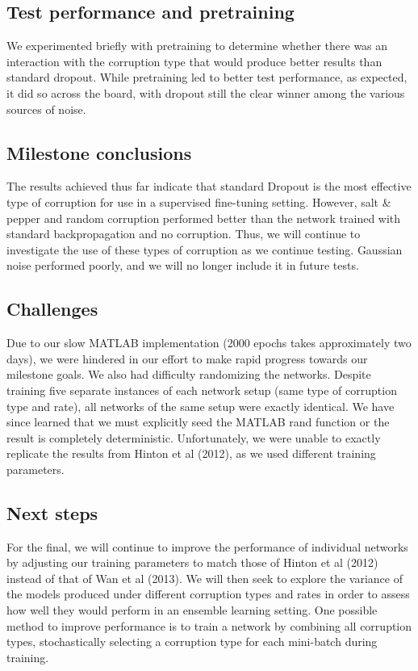 \documentclass{article} %
\begin{document}
\subsection{Test performance and pretraining}
We experimented briefly with pretraining to determine whether there was an interaction with the corruption type that would produce better results than standard dropout. While pretraining led to better test performance, as expected, it did so across the board, with dropout still the clear winner among the various sources of noise.

\subsection{Milestone conclusions}
The results achieved thus far indicate that standard Dropout is the most effective type of corruption for use in a supervised fine-tuning setting. However, salt \& pepper and random corruption performed better than the network trained with standard backpropagation and no corruption. Thus, we will continue to investigate the use of these types of corruption as we continue testing. Gaussian noise performed poorly, and we will no longer include it in future tests.

\subsection{Challenges}
Due to our slow MATLAB implementation (2000 epochs takes approximately two days), we were hindered in our effort to make rapid progress towards our milestone goals. We also had difficulty randomizing the networks. Despite training five separate instances of each network setup (same type of corruption type and rate), all networks of the same setup were exactly identical. We have since learned that we must explicitly seed the MATLAB rand function or the result is completely deterministic. Unfortunately, we were unable to exactly replicate the results from Hinton et al (2012), as we used different training parameters.

\subsection{Next steps}
For the final, we will continue to improve the performance of individual networks by adjusting our training parameters to match those of Hinton et al (2012) instead of that of Wan et al (2013). We will then seek to explore the variance of the models produced under different corruption types and rates in order to assess how well they would perform in an ensemble learning setting. One possible method to improve performance is to train a network by combining all corruption types, stochastically selecting a corruption type for each mini-batch during training.
\end{document}
